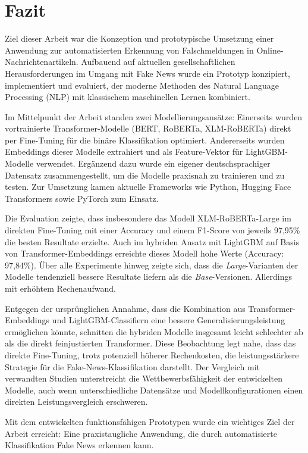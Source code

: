 \chapter{Fazit}
\label{chap:fazit}

Ziel dieser Arbeit war die Konzeption und prototypische Umsetzung einer Anwendung zur automatisierten Erkennung von Falschmeldungen in Online-Nachrichtenartikeln. 
Aufbauend auf aktuellen gesellschaftlichen Herausforderungen im Umgang mit Fake News wurde ein Prototyp konzipiert, 
implementiert und evaluiert, der moderne Methoden des Natural Language Processing (NLP) mit klassischem maschinellen Lernen kombiniert.

Im Mittelpunkt der Arbeit standen zwei Modellierungsansätze: Einerseits wurden vortrainierte Transformer-Modelle (BERT, RoBERTa, XLM-RoBERTa) 
direkt per Fine-Tuning für die binäre Klassifikation optimiert. Andererseits wurden Embeddings dieser Modelle extrahiert und als Feature-Vektor 
für LightGBM-Modelle verwendet. Ergänzend dazu wurde ein eigener deutschsprachiger Datensatz zusammengestellt, um die Modelle praxisnah zu trainieren und zu testen.
Zur Umsetzung kamen aktuelle Frameworks wie Python, Hugging Face Transformers sowie PyTorch zum Einsatz.

Die Evaluation zeigte, dass insbesondere das Modell XLM-RoBERTa-Large im direkten Fine-Tuning mit einer Accuracy und einem F1-Score von jeweils 97,95\% 
die besten Resultate erzielte. Auch im hybriden Ansatz mit LightGBM auf Basis von Transformer-Embeddings erreichte dieses Modell hohe Werte (Accuracy: 97,84\%). 
Über alle Experimente hinweg zeigte sich, dass die \textit{Large}-Varianten der Modelle tendenziell bessere Resultate liefern als die \textit{Base}-Versionen. 
Allerdings mit erhöhtem Rechenaufwand.

Entgegen der ursprünglichen Annahme, dass die Kombination aus Transformer-Embeddings und LightGBM-Classifiern eine bessere Generalisierungsleistung
ermöglichen könnte, schnitten die hybriden Modelle insgesamt leicht schlechter ab als die direkt feinjustierten Transformer. 
Diese Beobachtung legt nahe, dass das direkte Fine-Tuning, trotz potenziell höherer Rechenkosten, die leistungsstärkere Strategie für die Fake-News-Klassifikation 
darstellt. Der Vergleich mit verwandten Studien unterstreicht die Wettbewerbsfähigkeit der entwickelten Modelle, auch wenn unterschiedliche Datensätze und 
Modellkonfigurationen einen direkten Leistungsvergleich erschweren.

Mit dem entwickelten funktionsfähigen Prototypen wurde ein wichtiges Ziel der Arbeit erreicht: 
Eine praxistaugliche Anwendung, die durch automatisierte Klassifikation Fake News erkennen kann.

